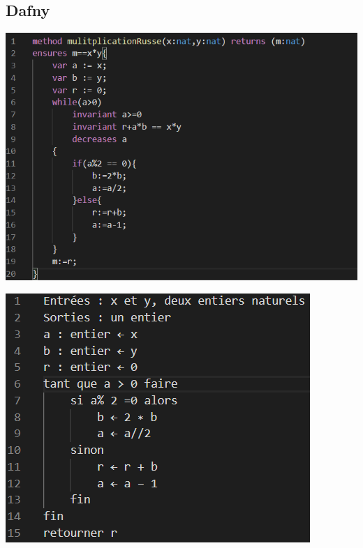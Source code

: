 \documentclass[12pt,a4paper]{report}
\begin{document}
\subsection{Dafny}
\begin{center}
\begin{minipage}{0.48\linewidth}
\includegraphics[width=\linewidth]{algoDafny}
\end{minipage}%
\hfill
\begin{minipage}{0.49\linewidth}
\includegraphics[width=\linewidth]{algoRusse}
\end{minipage}
\end{center}
\end{document}
